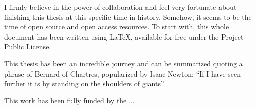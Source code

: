 \begin{acknowledgements}
I firmly believe in the power of collaboration and feel very fortunate about finishing this thesis at this specific time in history. Somehow, it seems to be the time of open source and open access resources. To start with, this whole document has been written using \LaTeX, available for free under the Project Public License. 

\blindtext

This thesis has been an incredible journey and can be summarized quoting a phrase of Bernard of Chartres, popularized by Isaac Newton: ``If I have seen further it is by standing on the shoulders of giants''.

\vfill

This work has been fully funded by the ...
\end{acknowledgements}
